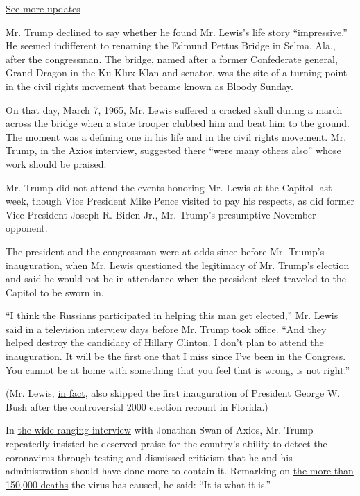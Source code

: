 \href{https://www.nytimes.com/2020/08/04/us/elections/primary-election-michigan-arizona-kansas.html?action=click\&pgtype=Article\&state=default\&region=MAIN_CONTENT_1\&context=storylines_live_updates}{See
more updates}

Mr. Trump declined to say whether he found Mr. Lewis's life story
``impressive.'' He seemed indifferent to renaming the Edmund Pettus
Bridge in Selma, Ala., after the congressman. The bridge, named after a
former Confederate general, Grand Dragon in the Ku Klux Klan and
senator, was the site of a turning point in the civil rights movement
that became known as Bloody Sunday.

On that day, March 7, 1965, Mr. Lewis suffered a cracked skull during a
march across the bridge when a state trooper clubbed him and beat him to
the ground. The moment was a defining one in his life and in the civil
rights movement. Mr. Trump, in the Axios interview, suggested there
``were many others also'' whose work should be praised.

Mr. Trump did not attend the events honoring Mr. Lewis at the Capitol
last week, though Vice President Mike Pence visited to pay his respects,
as did former Vice President Joseph R. Biden Jr., Mr. Trump's
presumptive November opponent.

The president and the congressman were at odds since before Mr. Trump's
inauguration, when Mr. Lewis questioned the legitimacy of Mr. Trump's
election and said he would not be in attendance when the president-elect
traveled to the Capitol to be sworn in.

``I think the Russians participated in helping this man get elected,''
Mr. Lewis said in a television interview days before Mr. Trump took
office. ``And they helped destroy the candidacy of Hillary Clinton. I
don't plan to attend the inauguration. It will be the first one that I
miss since I've been in the Congress. You cannot be at home with
something that you feel that is wrong, is not right.''

(Mr. Lewis,
\href{https://www.factcheck.org/2017/01/lewis-skipped-bushs-inauguration-too/}{in
fact}, also skipped the first inauguration of President George W. Bush
after the controversial 2000 election recount in Florida.)

In
\href{https://www.axios.com/trump-coronavirus-under-control-5f114a16-9952-428c-bc07-3cfa360b0977.html}{the
wide-ranging interview} with Jonathan Swan of Axios, Mr. Trump
repeatedly insisted he deserved praise for the country's ability to
detect the coronavirus through testing and dismissed criticism that he
and his administration should have done more to contain it. Remarking on
\href{https://www.nytimes.com/interactive/2020/us/coronavirus-us-cases.html}{the
more than 150,000 deaths} the virus has caused, he said: ``It is what it
is.''

